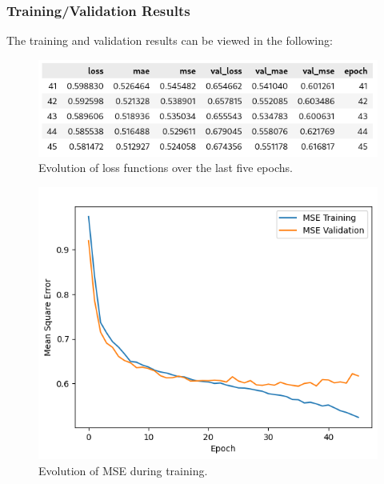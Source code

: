 \documentclass[sigconf,natbib=false]{acmart}
\begin{document}
\subsubsection{Training/Validation Results}

The training and validation results can be viewed in the following:

\begin{figure}[h]
 \centering
 \includegraphics[width=\linewidth]{figs/training_validation_table_results.png}
 \caption{Evolution of loss functions over the last five epochs.}
\end{figure}

\begin{figure}[h]
 \centering
 \includegraphics[width=\linewidth]{figs/mse_evolution.png}
 \caption{Evolution of MSE during training.}
\end{figure}
\end{document}
